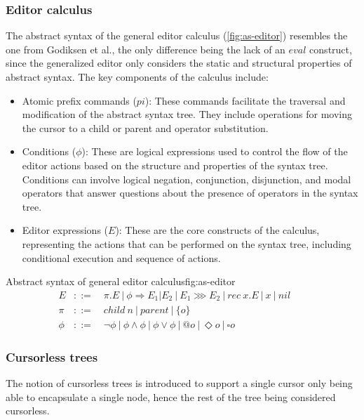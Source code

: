 \subsubsection{Editor calculus}
The abstract syntax of the general editor calculus (\cref{fig:as-editor}) resembles the one from Godiksen et al., the only difference being the lack of an $eval$ construct, since the generalized editor only considers the static and structural properties of abstract syntax. The key components of the calculus include:

\begin{itemize}
    \item Atomic prefix commands ($pi$): These commands facilitate the traversal and modification of the abstract syntax tree. They include operations for moving the cursor to a child or parent and operator substitution.
    \item Conditions ($\phi$): These are logical expressions used to control the flow of the editor actions based on the structure and properties of the syntax tree. Conditions can involve logical negation, conjunction, disjunction, and modal operators that answer questions about the
          presence of operators in the syntax tree.
    \item Editor expressions ($E$): These are the core constructs of the
          calculus, representing the actions that can be performed on the syntax tree, including conditional execution and sequence of actions.
\end{itemize}

\begin{myfigure}{Abstract syntax of general editor calculus}{fig:as-editor}
    \[
        \begin{aligned}
            E    & ::= \quad \pi.E \ | \ \phi \Rightarrow E_1|E_2 \ | \ E_1 \ggg E_2 \ | \ rec \ x.E \ | \ x \ | \ nil      &  & \\
            \pi  & ::= \quad child \ n \ | \ parent \ | \ \{ o \}                                                           &  & \\
            \phi & ::= \quad \neg \phi \ | \ \phi \land \phi \ | \ \phi \lor \phi \ | \ @o \ | \ \Diamond o \ | \ \square o
        \end{aligned}
    \]
\end{myfigure}

\subsubsection{Cursorless trees}
The notion of cursorless trees is introduced to support a single cursor only being able to encapsulate a single node, hence the rest of the tree being considered cursorless.


